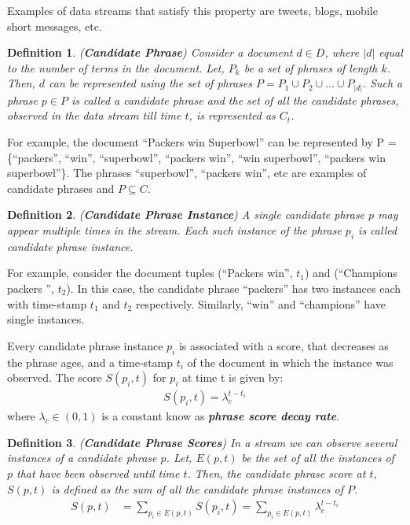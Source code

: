 \documentclass{sig-alternate}
\newtheorem{definition}{Definition}[section]
\begin{document}
Examples of data streams that satisfy this property are tweets, blogs, mobile short messages, etc.

\begin{definition} 
(\textbf{Candidate Phrase}) Consider a document $d \in D$, where $|d|$ equal to the number of terms in the document. Let, $P_k$ be a set of phrases of length $k$. Then, $d$ can be represented using the set of phrases $P = P_1 \cup P_2 \cup \dots \cup P_{|d|}$. Such a phrase $p \in P$ is called a candidate phrase and the set of all the candidate phrases, observed in the data stream till time $t$, is represented as $C_t$.
\end{definition}

For example, the document ``Packers win Superbowl'' can be represented by P = \{``packers'', ``win'', ``superbowl'', ``packers win'', ``win superbowl'', ``packers win superbowl''\}. The phrases ``superbowl'', ``packers win'', etc are examples of candidate phrases and $P \subseteq C$.

\begin{definition} 
(\textbf{Candidate Phrase Instance}) A single candidate phrase $p$ may appear multiple times  in the stream. Each such instance of the phrase $p_i$ is called candidate phrase instance.
\end{definition}

For example, consider the document tuples (``Packers win'', $t_1$) and (``Champions packers '', $t_2$). In this case, the candidate phrase ``packers'' has two instances each with time-stamp $t_1$ and $t_2$ respectively. Similarly, ``win'' and ``champions'' have single instances.

\medskip Every candidate phrase instance $p_i$ is associated with a score, that decreases as the phrase ages, and a time-stamp $t_i$ of the document in which the instance was observed. The score $S(p_i, t)$ for $p_i$ at time t is given by:
\begin{align}
S(p_i, t) =  \lambda_c^{t-t_i} 
\label{eq:instance_score}
\end{align}
\noindent where $\lambda_c \in (0,1)$ is a constant know as \textbf{\textit{phrase score decay rate}}. 

\begin{definition} 
(\textbf{Candidate Phrase Scores}) In a stream we can observe several instances of a candidate phrase $p$. Let, $E(p, t)$ be the set of all the instances of $p$ that have been observed until time $t$. Then, the candidate phrase score at $t$, $S(p, t)$ is defined as the sum of all the candidate phrase instances of $P$.
\begin{align*}
S(p, t) &= \sum_{p_i \in E(p, t)} S(p_i, t)   =  \sum_{p_i \in E(p, t)}  \lambda_c^{t-t_i} 
\end{align*}
\end{definition}
\end{document}
